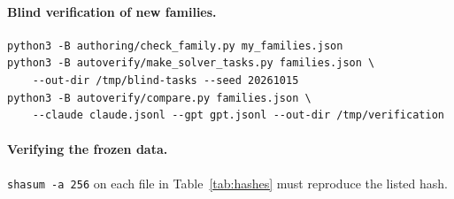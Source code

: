\documentclass[12pt,a4paper,oneside]{report}
\renewcommand{\_}{\oldunderscore\allowbreak}
\begin{document}
\paragraph{Blind verification of new families.}
\begin{verbatim}
python3 -B authoring/check_family.py my_families.json
python3 -B autoverify/make_solver_tasks.py families.json \
    --out-dir /tmp/blind-tasks --seed 20261015
python3 -B autoverify/compare.py families.json \
    --claude claude.jsonl --gpt gpt.jsonl --out-dir /tmp/verification
\end{verbatim}

\paragraph{Verifying the frozen data.} \texttt{shasum -a 256} on each file in Table~\ref{tab:hashes} must reproduce the listed hash.
\end{document}
